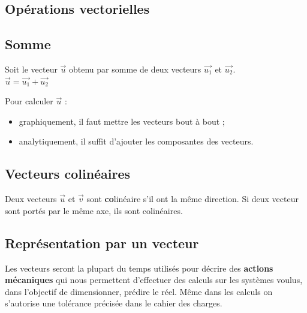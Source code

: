 \documentclass[
	11pt, %
	fleqn, %
	a4paper, %
]{LegrandOrangeBook}
\begin{document}
\subsection{Opérations vectorielles}
\subsection*{Somme}
Soit le vecteur $\Vec{u}$ obtenu par somme de deux vecteurs $\Vec{u_1}$ et $\Vec{u_2}$. \\
$\Vec{u} = \Vec{u_1} + \Vec{u_2}$

Pour calculer $\Vec{u}$ :
\begin{itemize}
    \item graphiquement, il faut mettre les vecteurs bout à bout ;
    \item analytiquement, il suffit d’ajouter les composantes des vecteurs.
\end{itemize}


\subsection*{Vecteurs colinéaires}

Deux vecteurs $\Vec{u}$ et $\Vec{v}$ sont \textbf{co}linéaire s'il ont la même direction. Si deux vecteur sont portés par le même axe, ils sont colinéaires. 


\subsection{Représentation par un vecteur}

Les vecteurs seront la plupart du temps utilisés pour décrire des \textbf{actions mécaniques} qui nous permettent d'effectuer des calculs sur les systèmes voulus, dans l'objectif de dimensionner, prédire le réel. Même dans les calculs on s'autorise une tolérance précisée dans le cahier des charges. 
\end{document}
